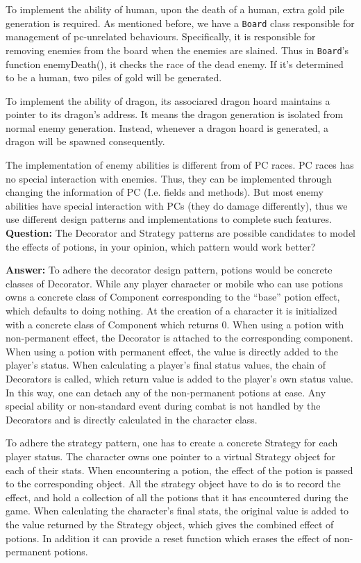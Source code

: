 \documentclass[11pt]{article}
\theoremstyle{plain} \newtheorem{theorem*}{Theorem}[subsection]
\begin{document}
To implement the ability of human, upon the death of a human, extra gold pile
generation is required. As mentioned before, we have a \texttt{Board} class 
responsible for management of pc-unrelated behaviours. Specifically, it is 
responsible for removing enemies from the board when the enemies are slained. 
Thus in \texttt{Board}’s function \textsf{enemyDeath()}, it checks the race of 
the dead enemy. If it’s determined to be a human, two piles of gold will be 
generated. 

To implement the ability of dragon, its associared dragon hoard maintains a
pointer to its dragon’s address. It means the dragon generation is isolated
from normal enemy generation. Instead, whenever a dragon hoard is generated, a
dragon will be spawned consequently.  

The implementation of enemy abilities is different from of PC races. PC races
has no special interaction with enemies. Thus, they can be implemented through
changing the information of PC (I.e. fields and methods). But most enemy
abilities have special interaction with PCs (they do damage differently), thus
we use different design patterns and implementations to complete such features. \\


\textbf{Question:}
The Decorator and Strategy patterns are possible candidates to model the
effects of potions, in your opinion, which pattern would work better? 

\textbf{Answer:}
To adhere the decorator design pattern, potions would be concrete classes of
Decorator. While any player character or mobile who can use potions owns a
concrete class of Component corresponding to the “base” potion effect, which
defaults to doing nothing. At the creation of a character it is initialized
with a concrete class of Component which returns 0. When using a potion with
non-permanent effect, the Decorator is attached to the corresponding component.
When using a potion with permanent effect, the value is directly added to the
player’s status. When calculating a player’s final status values, the chain of
Decorators is called, which return value is added to the player’s own status
value. In this way, one can detach any of the non-permanent potions at ease.
Any special ability or non-standard event during combat is not handled by the
Decorators and is directly calculated in the character class. 

To adhere the strategy pattern, one has to create a concrete Strategy for each
player status. The character owns one pointer to a virtual Strategy object for
each of their stats. When encountering a potion, the effect of the potion is
passed to the corresponding object. All the strategy object have to do is to
record the effect, and hold a collection of all the potions that it has
encountered during the game. When calculating the character’s final stats, the
original value is added to the value returned by the Strategy object, which
gives the combined effect of potions. In addition it can provide a reset
function which erases the effect of non-permanent potions.  
\end{document}
